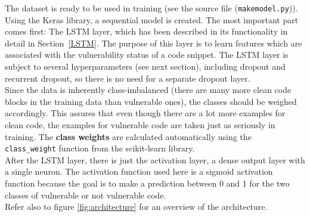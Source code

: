 \documentclass[
a4paper,
pagesize,
pdftex,
12pt,
ngerman,
fleqn,
final,
]{scrartcl}
\begin{document}
	The dataset is ready to be used in training (see the source file (\texttt{makemodel.py})). Using the Keras library, a sequential model is created. The most important part comes first: The LSTM layer, which has been described in its functionality in detail in Section~\ref{LSTM}. The purpose of this layer is to learn features which are associated with the vulnerability status of a code snippet. The LSTM layer is subject to several hyperparameters (see next section), including dropout and recurrent dropout, so there is no need for a separate dropout layer. \\
	Since the data is inherently class-imbalanced (there are many more clean code blocks in the training data than vulnerable ones), the classes should be weighed accordingly. This assures that even though there are a lot more examples for clean code, the examples for vulnerable code are taken just as seriously in training. The \textbf{class weights} are calculated automatically using the \texttt{class\_weight} function from the scikit-learn library.\\
	After the LSTM layer, there is just the activation layer, a dense output layer with a single neuron. The activation function used here is a sigmoid activation function because the goal is to make a prediction between 0 and 1 for the two classes of vulnerable or not vulnerable code.\\
	Refer also to figure \ref{fig:architecture} for an overview of the architecture.
	
\end{document}
